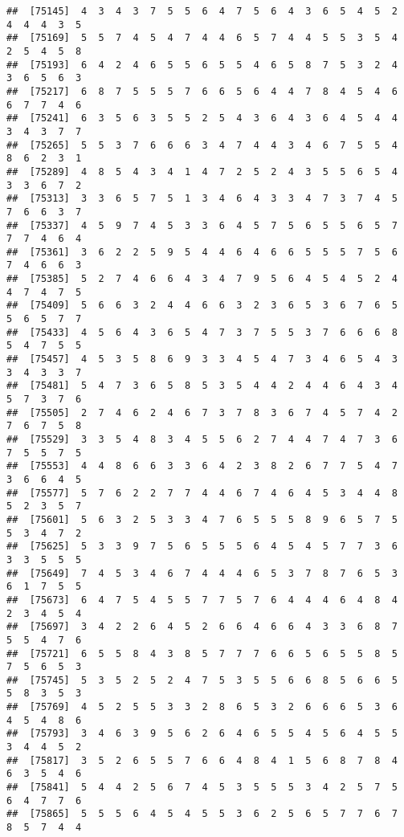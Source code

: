 \documentclass[
]{book}
\begin{document}
\begin{verbatim}
##  [75145]  4  3  4  3  7  5  5  6  4  7  5  6  4  3  6  5  4  5  2  4  4  4  3  5
##  [75169]  5  5  7  4  5  4  7  4  4  6  5  7  4  4  5  5  3  5  4  2  5  4  5  8
##  [75193]  6  4  2  4  6  5  5  6  5  5  4  6  5  8  7  5  3  2  4  3  6  5  6  3
##  [75217]  6  8  7  5  5  5  7  6  6  5  6  4  4  7  8  4  5  4  6  6  7  7  4  6
##  [75241]  6  3  5  6  3  5  5  2  5  4  3  6  4  3  6  4  5  4  4  3  4  3  7  7
##  [75265]  5  5  3  7  6  6  6  3  4  7  4  4  3  4  6  7  5  5  4  8  6  2  3  1
##  [75289]  4  8  5  4  3  4  1  4  7  2  5  2  4  3  5  5  6  5  4  3  3  6  7  2
##  [75313]  3  3  6  5  7  5  1  3  4  6  4  3  3  4  7  3  7  4  5  7  6  6  3  7
##  [75337]  4  5  9  7  4  5  3  3  6  4  5  7  5  6  5  5  6  5  7  7  7  4  6  4
##  [75361]  3  6  2  2  5  9  5  4  4  6  4  6  6  5  5  5  7  5  6  7  4  6  6  3
##  [75385]  5  2  7  4  6  6  4  3  4  7  9  5  6  4  5  4  5  2  4  4  7  4  7  5
##  [75409]  5  6  6  3  2  4  4  6  6  3  2  3  6  5  3  6  7  6  5  5  6  5  7  7
##  [75433]  4  5  6  4  3  6  5  4  7  3  7  5  5  3  7  6  6  6  8  5  4  7  5  5
##  [75457]  4  5  3  5  8  6  9  3  3  4  5  4  7  3  4  6  5  4  3  3  4  3  3  7
##  [75481]  5  4  7  3  6  5  8  5  3  5  4  4  2  4  4  6  4  3  4  5  7  3  7  6
##  [75505]  2  7  4  6  2  4  6  7  3  7  8  3  6  7  4  5  7  4  2  7  6  7  5  8
##  [75529]  3  3  5  4  8  3  4  5  5  6  2  7  4  4  7  4  7  3  6  7  5  5  7  5
##  [75553]  4  4  8  6  6  3  3  6  4  2  3  8  2  6  7  7  5  4  7  3  6  6  4  5
##  [75577]  5  7  6  2  2  7  7  4  4  6  7  4  6  4  5  3  4  4  8  5  2  3  5  7
##  [75601]  5  6  3  2  5  3  3  4  7  6  5  5  5  8  9  6  5  7  5  5  3  4  7  2
##  [75625]  5  3  3  9  7  5  6  5  5  5  6  4  5  4  5  7  7  3  6  3  3  5  5  5
##  [75649]  7  4  5  3  4  6  7  4  4  4  6  5  3  7  8  7  6  5  3  6  1  7  5  5
##  [75673]  6  4  7  5  4  5  5  7  7  5  7  6  4  4  4  6  4  8  4  2  3  4  5  4
##  [75697]  3  4  2  2  6  4  5  2  6  6  4  6  6  4  3  3  6  8  7  5  5  4  7  6
##  [75721]  6  5  5  8  4  3  8  5  7  7  7  6  6  5  6  5  5  8  5  7  5  6  5  3
##  [75745]  5  3  5  2  5  2  4  7  5  3  5  5  6  6  8  5  6  6  5  5  8  3  5  3
##  [75769]  4  5  2  5  5  3  3  2  8  6  5  3  2  6  6  6  5  3  6  4  5  4  8  6
##  [75793]  3  4  6  3  9  5  6  2  6  4  6  5  5  4  5  6  4  5  5  3  4  4  5  2
##  [75817]  3  5  2  6  5  5  7  6  6  4  8  4  1  5  6  8  7  8  4  6  3  5  4  6
##  [75841]  5  4  4  2  5  6  7  4  5  3  5  5  5  3  4  2  5  7  5  6  4  7  7  6
##  [75865]  5  5  5  6  4  5  4  5  5  3  6  2  5  6  5  7  7  6  7  8  5  7  4  4

\end{verbatim}
\end{document}
